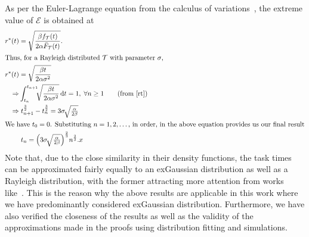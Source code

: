 As per the Euler-Lagrange equation from the calculus of variations~\cite{Bellman1954Dynamic,Arfken2015Calculus}, the extreme value of $\mathcal{E}$ is obtained at 
\begin{alignat}{1}
r^*(t)&=\sqrt{\dfrac{\beta f_\mathcal{T}(t)}{2\alpha\bar{F}_\mathcal{T}(t)}}.\\
\intertext{Thus, for a Rayleigh distributed $\mathcal{T}$ with parameter $\sigma$,}
r^*(t)&=\sqrt{\dfrac{\beta t}{2\alpha\sigma^2}}\\
\Rightarrow &\int_{t_n}^{t_{n+1}}\!\!\!\sqrt{\dfrac{\beta t}{2\alpha\sigma^2}}\,\mathrm{d}t=1,\;\forall n\geq1\nonumber\tag{from \eqref{rt}}\\
\Rightarrow &\;t_{n+1}^{\frac{3}{2}}-t_{n}^{\frac{3}{2}}=3\sigma\!\sqrt{\tfrac{\alpha}{2\beta}}\nonumber\\
\intertext{We have $t_0=0$. Substituting $n=1,2,\dots$, in order, in the above equation provides us our final result}
&\;t_n=\Big(3\sigma\!\sqrt{\tfrac{\alpha}{2\beta}}\Big)^{\frac{2}{3}}n^{\frac{2}{3}}\label{tnRayleigh}.
x\end{alignat}
Note that, due to the close similarity in their density functions, the task times can be approximated fairly equally to an \acl{exGaussian} distribution as well as a Rayleigh distribution, with the former attracting more attention from works like~\cite{Rohrer1994analysis,Palmer2011shapes,Marmolejo2022generalised}.
This is the reason why the above results are applicable in this work where we have predominantly considered \gls{exGaussian} distribution.
Furthermore, we have also verified the closeness of the results as well as the validity of the approximations made in the proofs using distribution fitting and simulations.

